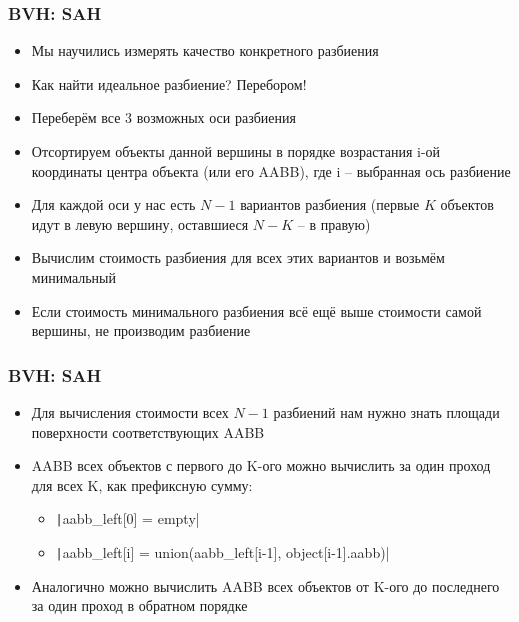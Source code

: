 \documentclass[10pt]{beamer}
\begin{document}
\begin{frame}[fragile]
\frametitle{BVH: SAH}
\begin{itemize}
\item Мы научились измерять качество конкретного разбиения
\pause
\item Как найти идеальное разбиение? \pause Перебором!
\pause
\item Переберём все 3 возможных оси разбиения
\pause
\item Отсортируем объекты данной вершины в порядке возрастания i-ой координаты центра объекта (или его AABB), где i -- выбранная ось разбиение
\pause
\item Для каждой оси у нас есть \begin{math}N-1\end{math} вариантов разбиения (первые \begin{math}K\end{math} объектов идут в левую вершину, оставшиеся \begin{math}N-K\end{math} -- в правую)
\pause
\item Вычислим стоимость разбиения для всех этих вариантов и возьмём минимальный
\pause
\item Если стоимость минимального разбиения всё ещё выше стоимости самой вершины, не производим разбиение
\end{itemize}
\end{frame}

\begin{frame}[fragile]
\frametitle{BVH: SAH}
\begin{itemize}
\item Для вычисления стоимости всех \begin{math}N-1\end{math} разбиений нам нужно знать площади поверхности соответствующих AABB
\pause
\item AABB всех объектов с первого до K-ого можно вычислить за один проход для всех K, как префиксную сумму:
\pause
\begin{itemize}
\item \texttt|aabb_left[0] = empty|
\pause
\item \texttt|aabb_left[i] = union(aabb_left[i-1], object[i-1].aabb)|
\end{itemize}
\pause
\item Аналогично можно вычислить AABB всех объектов от K-ого до последнего за один проход в обратном порядке
\end{itemize}
\end{frame}
\end{document}
